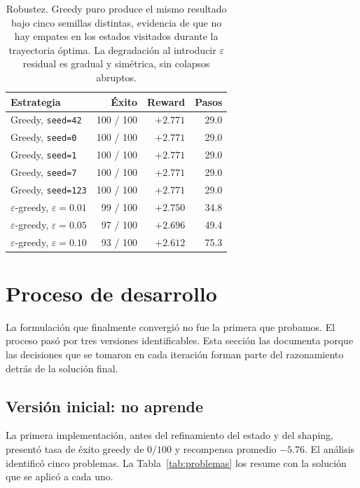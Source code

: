 \documentclass[11pt,a4paper]{article}
\begin{document}
\begin{table}[h]
  \centering
  \small
  \setlength{\extrarowheight}{2pt}
  \begin{tabular}{l r r r}
    \toprule
    \textbf{Estrategia} & \textbf{Éxito} & \textbf{Reward} & \textbf{Pasos} \\
    \midrule
    Greedy, \texttt{seed=42}  & 100 / 100 & \(+2.771\) & 29.0 \\
    Greedy, \texttt{seed=0}   & 100 / 100 & \(+2.771\) & 29.0 \\
    Greedy, \texttt{seed=1}   & 100 / 100 & \(+2.771\) & 29.0 \\
    Greedy, \texttt{seed=7}   & 100 / 100 & \(+2.771\) & 29.0 \\
    Greedy, \texttt{seed=123} & 100 / 100 & \(+2.771\) & 29.0 \\
    \midrule
    \(\varepsilon\)-greedy, \(\varepsilon = 0.01\) &  99 / 100 & \(+2.750\) & 34.8 \\
    \(\varepsilon\)-greedy, \(\varepsilon = 0.05\) &  97 / 100 & \(+2.696\) & 49.4 \\
    \(\varepsilon\)-greedy, \(\varepsilon = 0.10\) &  93 / 100 & \(+2.612\) & 75.3 \\
    \bottomrule
  \end{tabular}
  \caption{Robustez. Greedy puro produce el mismo resultado bajo cinco
  semillas distintas, evidencia de que no hay empates en los estados
  visitados durante la trayectoria óptima. La degradación al introducir
  \(\varepsilon\) residual es gradual y simétrica, sin colapsos
  abruptos.}
  \label{tab:robustez}
\end{table}

\section{Proceso de desarrollo}
\label{sec:proceso}

La formulación que finalmente convergió no fue la primera que probamos.
El proceso pasó por tres versiones identificables. Esta sección las
documenta porque las decisiones que se tomaron en cada iteración
forman parte del razonamiento detrás de la solución final.

\subsection{Versión inicial: no aprende}

La primera implementación, antes del refinamiento del estado y del
shaping, presentó tasa de éxito greedy de \(0/100\) y recompensa
promedio \(-5.76\). El análisis identificó cinco problemas. La
Tabla~\ref{tab:problemas} los resume con la solución que se aplicó a
cada uno.
\end{document}
